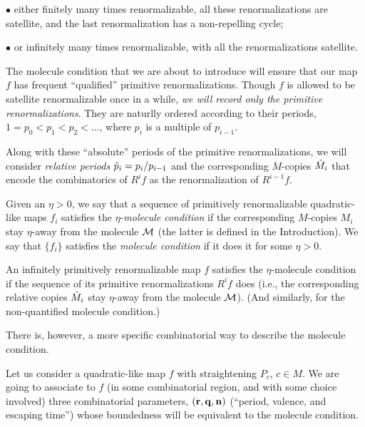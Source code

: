 \nin\ssk $\bullet$
 either finitely many times renormalizable, all these renormalizations are satellite,
  and the last renormalization has a non-repelling cycle;

\nin\ssk $\bullet$
  or  infinitely many times renormalizable, with all the renormalizations satellite.

\ssk The molecule condition that we are about to introduce will  ensure that our map $f$
  has frequent ``qualified'' primitive renormalizations.
Though  $f$ is allowed to be satellite renormalizable once in a while,
{\it we will   record only the primitive renormalizations}.
They  are naturlly ordered according to their periods,
$1=p_0 <p_1<p_2<\dots$, where  $p_i$ is a multiple of $p_{i-1}$. 

Along with these ``absolute'' periods of the primitive renormalizations,
we will consider {\it relative periods} $\tilde p_i = p_i/p_{i-1}$ and the corresponding $M$-copies
$\tilde M_i$ that encode the combinatorics of $R^i f$ as the renormalization of $R^{i-1} f$. 


Given an $\eta>0$, we say that a sequence of primitively renormalizable quadratic-like maps $f_i$
satisfies the $\eta$-{\it molecule condition}
if the corresponding  $M$-copies $M_i$  stay $\eta$-away from the molecule ${\mathcal M}$ 
(the latter is defined in the Introduction).
We say that $\{f_i\}$ satisfies the {\it molecule condition} if it does it for some $\eta>0$.
    
An infinitely primitively  renormalizable map $f$  satisfies the $\eta$-molecule condition
if the sequence of its primitive renormalizations $R^i f$ does
(i.e.,  the corresponding relative copies $\tilde M_i$ stay $\eta$-away from the molecule ${\mathcal M}$).   
(And similarly, for  the non-quantified molecule condition.)

\msk There is, however, a more specific combinatorial way to describe the molecule condition. 

Let us consider a quadratic-like map $f$ with straightening $P_c$, $c\in M$.
We are going to associate  to  $f$ (in some combinatorial region, and with some choice involved)
three combinatorial parameters, $({\mathbf{r}},{\mathbf{q}},{\mathbf{n}})$ (``period, valence, and escaping time'')
whose boundedness will be equivalent to the molecule condition.
 
